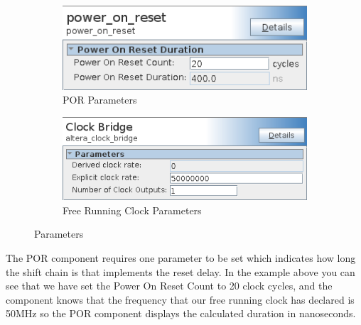 \documentclass{article}
\begin{document}
\begin{flushleft}
\begin{figure}[H]
\begin{subfigure}{0.495\textwidth}
\centering
\includegraphics[scale=0.675]{por_parameters}
\caption{POR Parameters}
\label{fig:por_parameters}
\end{subfigure}
\begin{subfigure}{0.495\textwidth}
\centering
\includegraphics[scale=0.675]{por_clock_parameters}
\caption{Free Running Clock Parameters}
\label{fig:por_clock_parameters}
\end{subfigure}
\caption{Parameters}
\label{fig:por_qsys_parameters}
\end{figure}

The POR component requires one parameter to be set which indicates how long the shift chain is that implements the reset delay.  In the example above you can see that we have set the Power On Reset Count to 20 clock cycles, and the component knows that the frequency that our free running clock has declared is 50MHz so the POR component displays the calculated duration in nanoseconds.

\end{flushleft}

\end{document}
